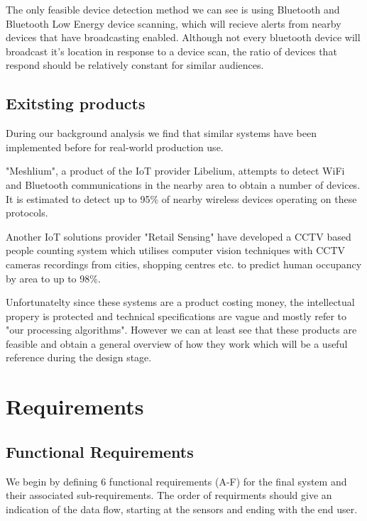\documentclass{l4proj}
\begin{document}
The only feasible device detection method we can see is using Bluetooth and Bluetooth Low Energy device scanning, which will recieve alerts from nearby devices that have broadcasting enabled. Although not every bluetooth device will broadcast it's location in response to a device scan, the ratio of devices that respond should be relatively constant for similar audiences. 
 

\section{Exitsting products}
During our background analysis we find that similar systems have been implemented before for real-world production use.

"Meshlium", a product of the IoT provider Libelium, attempts to detect WiFi and Bluetooth communications in the nearby area to obtain a number of devices. It is estimated to detect up to 95\% of nearby wireless devices operating on these protocols\cite{c-meshlium}.

Another IoT solutions provider "Retail Sensing" have developed a CCTV based people counting system which utilises computer vision techniques with CCTV cameras recordings from cities, shopping centres etc. to predict human occupancy by area to up to 98\%\cite{c-sensing}.

Unfortunatelty since these systems are a product costing money, the intellectual propery is protected and technical specifications are vague and mostly refer to "our processing algorithms". However we can at least see that these products are feasible and obtain a general overview of how they work which will be a useful reference during the design stage.



\chapter{Requirements}

\section{Functional Requirements}

We begin by defining 6 functional requirements (A-F) for the final system and their associated sub-requirements. The order of requirments should give an indication of the data flow, starting at the sensors and ending with the end user.
\end{document}
